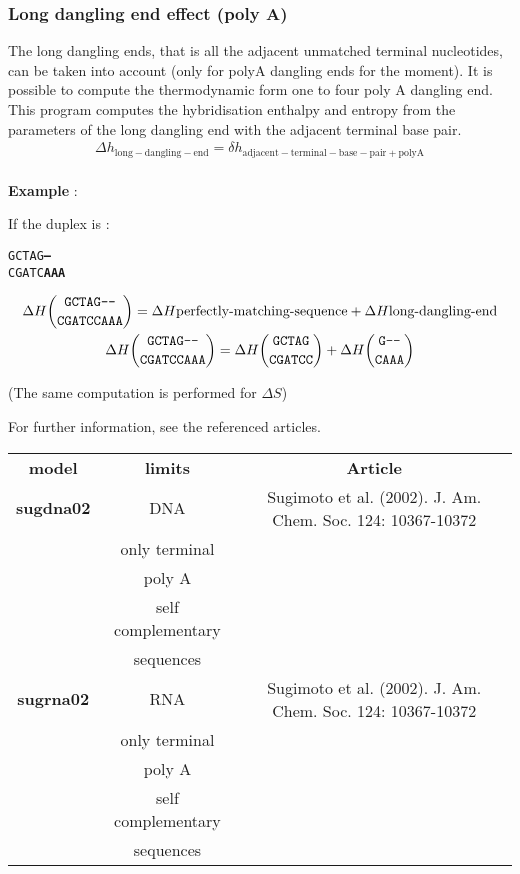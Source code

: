 \documentclass{article}
\begin{document}
\subsubsection{Long dangling end effect (poly A)}

The long dangling ends, that is all the adjacent unmatched terminal nucleotides, can be taken into
account (only for polyA dangling ends for the moment). It is possible to compute the thermodynamic 
form one to four poly A dangling end. This program computes the hybridisation enthalpy 
and entropy from the parameters of the long dangling end with the adjacent terminal base pair.  
\begin{multline*}
\Delta{}h_\mathrm{long-dangling-end} =
\delta{}h_\mathrm{adjacent-terminal-base-pair+polyA} \\ 
\end{multline*}

\textbf{Example} :

If the duplex is :
\begin{alltt}
GCTAG\textbf{---}
CGATC\textbf{AAA}
\end{alltt}
\begin{multline*}
\Delta H {\mbox{\texttt{GCTAG---}} \choose \mbox{\texttt{CGATCCAAA}}} =
\Delta H {\mbox{perfectly-matching-sequence}} +
\Delta H {\mbox{long-dangling-end}} \\
\Delta H {\mbox{\texttt{GCTAG---}} \choose \mbox{\texttt{CGATCCAAA}}} =
\Delta H {\mbox{\texttt{GCTAG}} \choose \mbox{\texttt{CGATCC}}} +
\Delta H {\mbox{\texttt{G---}} \choose \mbox{\texttt{CAAA}}} \\
\end{multline*}

       (The same computation is performed for $\Delta S$)

For further information, see the referenced articles.

\begin{table}[h]
\begin{tabular}[h]{| c | c | c |}
\textbf{model} & \textbf{limits} & \textbf{Article} \\
\textbf{sugdna02} & DNA & Sugimoto et al. (2002). J. Am. Chem. Soc. 124: 10367-10372 \\
& only terminal & \\
 & poly A & \\
 & self complementary & \\
 & sequences & \\
\textbf{sugrna02} & RNA & Sugimoto et al. (2002). J. Am. Chem. Soc. 124: 10367-10372 \\
& only terminal & \\
 & poly A & \\
 & self complementary & \\
 & sequences & \\
\end{tabular}
\end{table}
\end{document}
